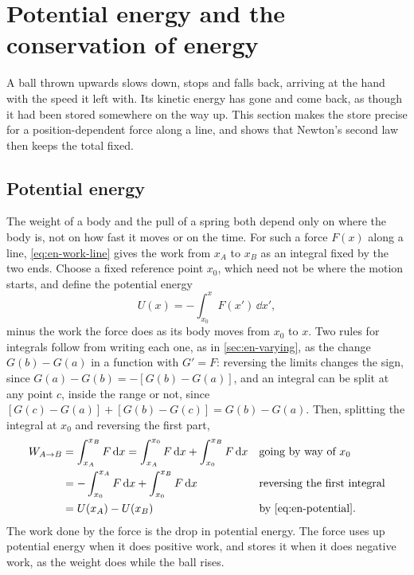 \section{Potential energy and the conservation of energy}
\label{sec:en-potential}

A ball thrown upwards slows down, stops and falls back, arriving at the
hand with the speed it left with. Its kinetic energy has gone and come
back, as though it had been stored somewhere on the way up. This section
makes the store precise for a position-dependent force along a line, and
shows that Newton's second law then keeps the total fixed.

\subsection*{Potential energy}

The weight of a body and the pull of a spring both depend only on where
the body is, not on how fast it moves or on the time. For such a force
$F(x)$ along a line, \cref{eq:en-work-line} gives the work from $x_A$ to
$x_B$ as an integral fixed by the two ends. Choose a fixed reference
point $x_0$, which need not be where the motion starts, and define the
potential energy
\begin{equation}
   U(x) = -\int_{x_0}^{x} F(x')\,\dd x' ,
   \label{eq:en-potential}
\end{equation}
minus the work the force does as its body moves from $x_0$ to $x$. Two
rules for integrals follow from writing each one, as in
\cref{sec:en-varying}, as the change $G(b) - G(a)$ in a function with $G'
= F$: reversing the limits changes the sign, since $G(a) - G(b) =
-[G(b) - G(a)]$, and an integral can be split at any point $c$, inside the
range or not, since $[G(c) - G(a)] + [G(b) - G(c)] = G(b) - G(a)$. Then,
splitting the integral at $x_0$ and reversing the first part,
\begin{align*}
   W_{A\to B} &= \int_{x_A}^{x_B} F\,\dd x
   = \int_{x_A}^{x_0} F\,\dd x + \int_{x_0}^{x_B} F\,\dd x
      && \text{going by way of $x_0$}\\
   &= -\int_{x_0}^{x_A} F\,\dd x + \int_{x_0}^{x_B} F\,\dd x
      && \text{reversing the first integral}\\
   &= U(x_A) - U(x_B)
      && \text{by \cref{eq:en-potential}.}
\end{align*}
The work done by the force is the drop in potential energy. The force
uses up potential energy when it does positive work, and stores it when
it does negative work, as the weight does while the ball rises.

